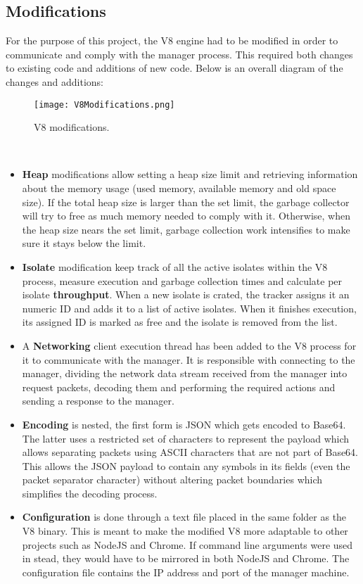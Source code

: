 \documentclass{l4proj}
\begin{document}
\subsection{Modifications}
\hspace*{3em} For the purpose of this project, the V8 engine had to be modified in order to communicate and comply with the manager process. This required both changes to existing code and additions of new code. Below is an overall diagram of the changes and additions:\\
\begin{figure}[!ht]
  \centering
    \texttt{[image: V8Modifications.png]}
	\caption{V8 modifications.}
\end{figure}\\
\begin{itemize}
\item \textbf{Heap} modifications allow setting a heap size limit and retrieving information about the memory usage (used memory, available memory and old space size). If the total heap size is larger than the set limit, the garbage collector will try to free as much memory needed to comply with it. Otherwise, when the heap size nears the set limit, garbage collection work intensifies to make sure it stays below the limit.
\item \textbf{Isolate} modification keep track of all the active isolates within the V8 process, measure execution and garbage collection times and calculate per isolate \textbf{throughput}. When a new isolate is crated, the tracker assigns it an numeric ID and adds it to a list of active isolates. When it finishes execution, its assigned ID is marked as free and the isolate is removed from the list.
\item A \textbf{Networking} client execution thread has been added to the V8 process for it to communicate with the manager. It is responsible with connecting to the manager, dividing the network data stream received from the manager into request packets, decoding them and performing the required actions and sending a response to the manager.
\item \textbf{Encoding} is nested, the first form is JSON which gets encoded to Base64. The latter uses a restricted set of characters to represent the payload which allows separating packets using ASCII characters that are not part of Base64. This allows the JSON payload to contain any symbols in its fields (even the packet separator character) without altering packet boundaries which simplifies the decoding process.
\item \textbf{Configuration} is done through a text file placed in the same folder as the V8 binary. This is meant to make the modified V8 more adaptable to other projects such as NodeJS and Chrome. If command line arguments were used in stead, they would have to be mirrored in both NodeJS and Chrome. The configuration file contains the IP address and port of the manager machine.
\end{itemize}
\end{document}
